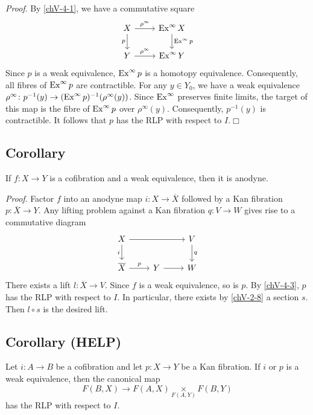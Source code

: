         \emph{Proof}. By \ref{chV-4-1}, we have a commutative square
        \begin{equation*}
            \begin{tikzcd}
                X \arrow[d, "p"'] \arrow[r, "\rho^{\infty}"] & \Ex^{\infty} X \arrow[d, "\Ex^{\infty} p"] \\
                Y \arrow[r, "\rho^{\infty}"] & \Ex^{\infty} Y
            \end{tikzcd}
        \end{equation*}
        Since $p$ is a weak equivalence, $\operatorname{Ex}^{\infty} p$ is a homotopy equivalence. Consequently, all fibres of $\operatorname{Ex}^{\infty} p$ are contractible. For any $y \in Y_0$, we have a weak equivalence $\rho^{\infty} \colon p^{-1}(y) \to (\operatorname{Ex}^{\infty} p)^{-1} (\rho^{\infty}(y))$. Since $\operatorname{Ex}^{\infty}$ preserves finite limits, the target of this map is the fibre of $\operatorname{Ex}^{\infty} p$ over $\rho^{\infty}(y)$. Consequently, $p^{-1}(y)$ is contractible. It follows that $p$ has the RLP with respect to $I$.\hfill$\Box$

    \subsection{Corollary}\label{chV-4-4}
        If $f \colon X \to Y$ is a cofibration and a weak equivalence, then it is anodyne.
        \smallskip

        \emph{Proof}. Factor $f$ into an anodyne map $i \colon X \to \overline{X}$ followed by a Kan fibration $p \colon \overline{X} \to Y$. Any lifting problem against a Kan fibration $q \colon V \to W$ gives rise to a commutative diagram
        \begin{equation*}
            \begin{tikzcd}
                X \arrow[d, "i"'] \arrow[rr] & & V \arrow[d, "q"] \\
                \overline{X} \arrow[r, "p"] & Y \arrow[r] & W
            \end{tikzcd}
        \end{equation*}
        There exists a lift $l \colon \overline{X} \to V$. Since $f$ is a weak equivalence, so is $p$. By \ref{chV-4-3}, $p$ has the RLP with respect to $I$. In particular, there exists by \ref{chV-2-8} a section $s$. Then $l \circ s$ is the desired lift.

    \subsection{Corollary (HELP)}\label{chV-4-5}
        Let $i \colon A \to B$ be a cofibration and let $p \colon X \to Y$ be a Kan fibration. If $i$ or $p$ is a weak equivalence, then the canonical map
        \begin{equation*}
            F(B, X) \to F(A, X) \underset{F(A, Y)}{\times} F(B, Y)
        \end{equation*}
        has the RLP with respect to $I$.
        \smallskip

